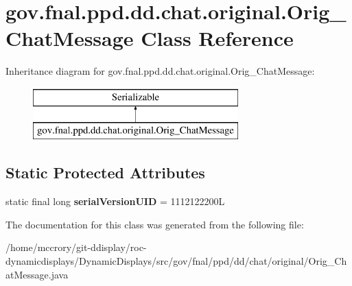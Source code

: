 \hypertarget{classgov_1_1fnal_1_1ppd_1_1dd_1_1chat_1_1original_1_1Orig__ChatMessage}{\section{gov.\-fnal.\-ppd.\-dd.\-chat.\-original.\-Orig\-\_\-\-Chat\-Message Class Reference}
\label{classgov_1_1fnal_1_1ppd_1_1dd_1_1chat_1_1original_1_1Orig__ChatMessage}
}
Inheritance diagram for gov.\-fnal.\-ppd.\-dd.\-chat.\-original.\-Orig\-\_\-\-Chat\-Message\-:\begin{figure}[H]
\begin{center}
\leavevmode
\includegraphics[height=2.000000cm]{classgov_1_1fnal_1_1ppd_1_1dd_1_1chat_1_1original_1_1Orig__ChatMessage}
\end{center}
\end{figure}
\subsection*{Static Protected Attributes}
\begin{DoxyCompactItemize}
\item 
\hypertarget{classgov_1_1fnal_1_1ppd_1_1dd_1_1chat_1_1original_1_1Orig__ChatMessage_a4bcf6ea6cc0667a564c60e207bcc9aba}{static final long {\bfseries serial\-Version\-U\-I\-D} = 1112122200\-L}\label{classgov_1_1fnal_1_1ppd_1_1dd_1_1chat_1_1original_1_1Orig__ChatMessage_a4bcf6ea6cc0667a564c60e207bcc9aba}

\end{DoxyCompactItemize}


The documentation for this class was generated from the following file\-:\begin{DoxyCompactItemize}
\item 
/home/mccrory/git-\/ddisplay/roc-\/dynamicdisplays/\-Dynamic\-Displays/src/gov/fnal/ppd/dd/chat/original/Orig\-\_\-\-Chat\-Message.\-java\end{DoxyCompactItemize}
